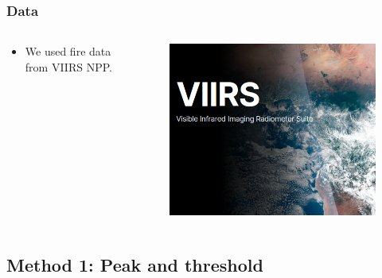 \documentclass[aspectratio=169]{beamer}
\begin{document}
\begin{frame}
    \frametitle{Data}
    \begin{columns}
        \begin{column}{0.5\linewidth}
            \begin{itemize}
                \item We used fire data from VIIRS NPP.
            \end{itemize}
        \end{column}
        \begin{column}{0.5\linewidth}
            \begin{figure}
                \includegraphics[width=0.9\linewidth]{./logos/viirs.png}
            \end{figure}
        \end{column}
    \end{columns}
\end{frame}

\subsection{Method 1: Peak and threshold}
\end{document}
